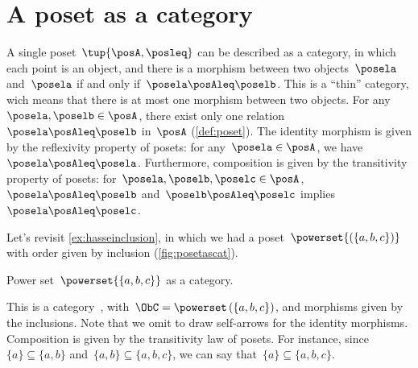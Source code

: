 

\section{A poset as a category}
\label{sec:posetsarecats}
A single poset~$\tup{\posA, \posleq}$ can be described as a category, in which each point is an object, and there is a morphism between two objects~$\posela$ and~$\posela$ if and only if~$\posela \posAleq \poselb$. This is a ``thin'' category, wich means that there is at most one morphism
between two objects. For any~$\posela,\poselb\in \posA$, there exist only one relation~$\posela\posAleq \poselb$ in~$\posA$ (\cref{def:poset}). The identity morphism is given by the reflexivity property of posets: for any~$\posela\in \posA$, we have~$\posela \posAleq \posela$. Furthermore, composition is given by the transitivity property of posets: for~$\posela,\poselb,\poselc \in \posA$,~$\posela\posAleq \poselb$ and~$\poselb\posAleq \poselc$ implies~$\posela\posAleq \poselc$.

\begin{example}
  Let's revisit \cref{ex:hasseinclusion}, in which we had a poset~$\powerset{\left(\{a,b,c\}\right)}$ with order given by inclusion (\cref{fig:posetascat}).

  \begin{marginfigure}
    \begin{center}
    \end{center}
    \caption{Power set~$\powerset{\{a,b,c\}}$ as a category. \label{fig:posetascat}}
  \end{marginfigure}

  This is a category~\CatC, with~$\ObC=\powerset\left(\{a,b,c\}\right)$, and morphisms given by the inclusions. Note that we omit to draw self-arrows for the identity morphisms. Composition is given by the transitivity law of posets. For instance, since~$\{a\}\subseteq \{a,b\}$ and~$\{a,b\} \subseteq \{a,b,c\}$, we can say that~$\{a\}\subseteq \{a,b,c\}$.
\end{example}

